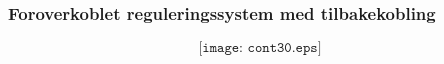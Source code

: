 \documentclass{beamer}
\begin{document}
%
%
\begin{frame}
	\frametitle{Foroverkoblet reguleringssystem med tilbakekobling}

	
$$\texttt{[image: cont30.eps]}$$

\end{frame}
\end{document}

